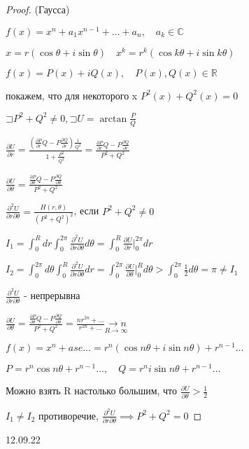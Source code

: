 \documentclass[a4paper, 12pt]{article}
\newcommand\letsymbol{\mathord{\sqsupset}}
\theoremstyle{definition}
\theoremstyle{remark}
\begin{document}
\begin{proof}(Гаусса)

     $f(x) = x^n + a_1x^{n-1}+ \dots+a_n,\quad a_k\in \mathbb{C} $

     $x = r(\cos \theta + i\sin \theta)\quad x^k = r^k(\cos {k\theta} + i\sin {k\theta})$

     $f(x) = P(x)+iQ(x), \quad P(x), Q(x) \in \mathbb{R} $

     покажем, что для некоторого x $P^2(x)+Q^2(x) = 0$
     
     $\letsymbol{}P^2+Q^2 \neq 0, \letsymbol{} U = \arctan \frac P Q$

     $\frac{\partial U}{\partial r} = \frac{(\frac{\partial P}{\partial r}Q - P\frac{\partial Q}{\partial r})\frac 1 {Q^2}}{1+\frac{P^2}{Q^2}} = \frac{\frac{\partial P}{\partial r}Q - P\frac{\partial Q}{\partial r}}{P^2 + Q^2}$

     $\frac{\partial U}{\partial \theta} = \frac{\frac{\partial P}{\partial \theta}Q - P\frac{\partial Q}{\partial \theta}}{P^2 + Q^2}$

     $\frac{\partial^2 U}{\partial r \partial \theta} = \frac{H(r, \theta)}{{(P^2+Q^2)}^2}$, если $P^2+Q^2 \neq 0$

     $I_1 = \int_0^R dr \int_0^{2\pi}\frac{\partial^2 U}{\partial r \partial \theta}d\theta = \int_0^R \frac{\partial U}{\partial r}{\Bigg |}_0^{2\pi}  dr$

     $I_2 = \int_0^{2\pi} d\theta \int_0^{R}\frac{\partial^2 U}{\partial r \partial \theta}dr = \int_0^{2\pi} \frac{\partial U}{\partial \theta}{\Bigg |}_0^{R} d\theta > \int_0^{2\pi} \frac 1 2 d\theta = \pi \neq I_1$
     
     $\frac{\partial^2 U}{\partial r \partial \theta}$ - непрерывна

     $\frac{\partial U}{\partial \theta} = \frac{\frac{\partial P}{\partial \theta}Q - P\frac{\partial Q}{\partial \theta}}{P^2 + Q^2} = \frac{nr^{2n} + \dots}{r^{2n}+ \dots} \underset{R\to \infty}{\to n}$

     $f(x) = x^n +ase \dots = r^n(\cos{n\theta} + i\sin{n\theta}) + r^{n-1}\dots$
     
     $P = r^n\cos{n\theta}+ r^{n-1}\dots, \quad Q = r^ni\sin{n\theta}+ r^{n-1}\dots$

     Можно взять R настолько большим, что $\frac{\partial U}{\partial \theta}> \frac{1}{2}$

     $I_1 \neq I_2$ противоречие, $\frac{\partial^2 U}{\partial r \partial \theta} \implies P^2 + Q^2 = 0$ 
\end{proof}
12.09.22
\end{document}
